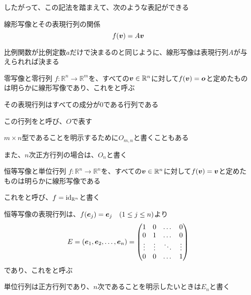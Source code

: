 \documentclass[../../../topic_linear-algebra]{subfiles}
\begin{document}
\br

したがって、この記法を踏まえて、次のような表記ができる

\begin{theorem*}{線形写像とその表現行列の関係}
  \begin{equation*}
    f(\vb*{v}) = A\vb*{v}
  \end{equation*}
\end{theorem*}

比例関数が比例定数$a$だけで決まるのと同じように、線形写像は表現行列$A$が与えられれば決まる

\sectionline

\begin{definition*}{零写像と零行列}
  $f\colon \mathbb{R}^n \to \mathbb{R}^m$を、すべての$\vb*{v} \in \mathbb{R}^n$に対して$f(\vb*{v}) = \vb*{o}$と定めたものは明らかに線形写像であり、これをと呼ぶ

  その表現行列はすべての成分が0である行列である

  この行列をと呼び、$O$で表す
\end{definition*}

$m \times n$型であることを明示するために$O_{m,n}$と書くこともある

また、$n$次正方行列の場合は、$O_n$と書く

\sectionline

\begin{definition*}{恒等写像と単位行列}
  $f\colon \mathbb{R}^n \to \mathbb{R}^n$を、すべての$\vb*{v} \in \mathbb{R}^n$に対して$f(\vb*{v}) = \vb*{v}$と定めたものは明らかに線形写像である

  これをと呼び、$f = \operatorname{id}_{\mathbb{R}^n}$と書く

  恒等写像の表現行列は、$f(\vb*{e}_j) = \vb*{e}_j \quad (1 \leq j \leq n)$より
  \begin{equation*}
    E = (\vb*{e}_1, \vb*{e}_2, \dots, \vb*{e}_n) = \begin{pmatrix}
      1      & 0      & \dots  & 0      \\
      0      & 1      & \dots  & 0      \\
      \vdots & \vdots & \ddots & \vdots \\
      0      & 0      & \dots  & 1
    \end{pmatrix}
  \end{equation*}
  であり、これをと呼ぶ
\end{definition*}

単位行列は正方行列であり、$n$次であることを明示したいときは$E_n$と書く
\end{document}
